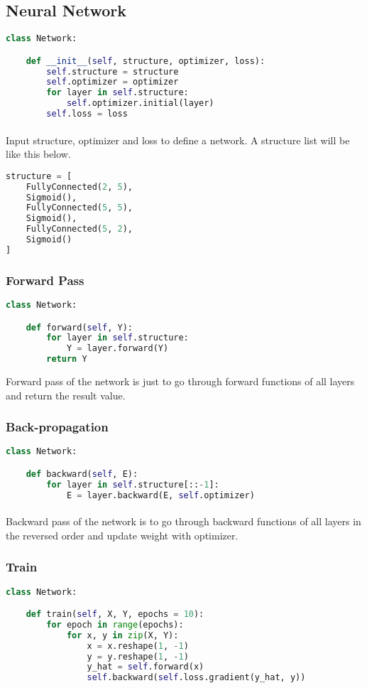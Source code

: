 \subsection{Neural Network}
\begin{lstlisting}[language=Python]
class Network:

    def __init__(self, structure, optimizer, loss):
        self.structure = structure
        self.optimizer = optimizer
        for layer in self.structure:
            self.optimizer.initial(layer)
        self.loss = loss
\end{lstlisting}
\paragraph{}
Input structure, optimizer and loss to define a network. A structure list will be like this below.
\begin{lstlisting}[language=Python]
structure = [
    FullyConnected(2, 5),
    Sigmoid(),
    FullyConnected(5, 5),
    Sigmoid(),
    FullyConnected(5, 2),
    Sigmoid()
]
\end{lstlisting}
\subsubsection{Forward Pass}
\begin{lstlisting}[language=Python]
class Network:

    def forward(self, Y):
        for layer in self.structure:
            Y = layer.forward(Y)
        return Y
\end{lstlisting}
Forward pass of the network is just to go through forward functions of all layers and return the result value.
\subsubsection{Back-propagation}
\begin{lstlisting}[language=Python]
class Network:

    def backward(self, E):
        for layer in self.structure[::-1]:
            E = layer.backward(E, self.optimizer)
\end{lstlisting}
\paragraph{}
Backward pass of the network is to go through backward functions of all layers in the reversed order and update weight with optimizer.
\subsubsection{Train}
\begin{lstlisting}[language=Python]
class Network:

    def train(self, X, Y, epochs = 10):
        for epoch in range(epochs):
            for x, y in zip(X, Y):
                x = x.reshape(1, -1)
                y = y.reshape(1, -1)
                y_hat = self.forward(x)
                self.backward(self.loss.gradient(y_hat, y))
\end{lstlisting}
